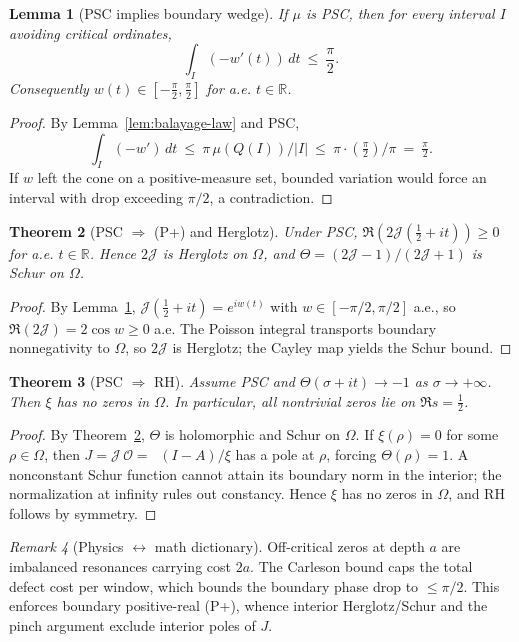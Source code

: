 \documentclass[11pt]{article}
\newtheorem{theorem}{Theorem}
\newtheorem{lemma}[theorem]{Lemma}
\theoremstyle{definition}
\theoremstyle{remark}
\newtheorem{remark}[theorem]{Remark}
\newcommand{\R}{\mathbb{R}}
\DeclareMathOperator{\dettwo}{det_2}
\begin{document}
\begin{lemma}[PSC implies boundary wedge]\label{lem:wedge-PSC}
If \(\mu\) is PSC, then for every interval \(I\) avoiding critical ordinates,
\[\int_I (-w'(t))\,dt\ \le\ \frac{\pi}{2}.\]
Consequently \(w(t)\in[-\tfrac{\pi}{2},\tfrac{\pi}{2}]\) for a.e. \(t\in\R\).
\end{lemma}
\begin{proof}
By Lemma~\ref{lem:balayage-law} and PSC,
\[\int_I (-w')\,dt\ \le\ \pi\,\mu(Q(I))/|I|\ \le\ \pi\cdot(\tfrac{\pi}{2})/\pi\ =\ \tfrac{\pi}{2}.
\]
If \(w\) left the cone on a positive-measure set, bounded variation would force an interval with drop exceeding \(\pi/2\), a contradiction.
\end{proof}

\begin{theorem}[PSC \(\Rightarrow\) (P+) and Herglotz]\label{thm:PSC-Pplus}
Under PSC, \(\Re(2\mathcal J(\tfrac12+it))\ge 0\) for a.e. \(t\in\R\). Hence \(2\mathcal J\) is Herglotz on \(\Omega\), and \(\Theta=(2\mathcal J-1)/(2\mathcal J+1)\) is Schur on \(\Omega\).
\end{theorem}
\begin{proof}
By Lemma~\ref{lem:wedge-PSC}, \(\mathcal J(\tfrac12+it)=e^{iw(t)}\) with \(w\in[-\pi/2,\pi/2]\) a.e., so \(\Re(2\mathcal J)=2\cos w\ge 0\) a.e.
The Poisson integral transports boundary nonnegativity to \(\Omega\), so \(2\mathcal J\) is Herglotz; the Cayley map yields the Schur bound.
\end{proof}

\begin{theorem}[PSC \(\Rightarrow\) RH]\label{thm:PSC-RH}
Assume PSC and \(\Theta(\sigma+it)\to -1\) as \(\sigma\to+\infty\). Then \(\xi\) has no zeros in \(\Omega\). In particular, all nontrivial zeros lie on \(\Re s=\tfrac12\).
\end{theorem}
\begin{proof}
By Theorem~\ref{thm:PSC-Pplus}, \(\Theta\) is holomorphic and Schur on \(\Omega\).
If \(\xi(\rho)=0\) for some \(\rho\in\Omega\), then \(J=\mathcal J\,\mathcal O=\dettwo(I-A)/\xi\) has a pole at \(\rho\), forcing \(\Theta(\rho)=1\). A nonconstant Schur function cannot attain its boundary norm in the interior; the normalization at infinity rules out constancy. Hence \(\xi\) has no zeros in \(\Omega\), and RH follows by symmetry.
\end{proof}

\begin{remark}[Physics $\leftrightarrow$ math dictionary]
Off-critical zeros at depth \(a\) are imbalanced resonances carrying cost \(2a\). The Carleson bound caps the total defect cost per window, which bounds the boundary phase drop to \(\le\pi/2\). This enforces boundary positive-real (P+), whence interior Herglotz/Schur and the pinch argument exclude interior poles of \(J\).
\end{remark}
\end{document}
